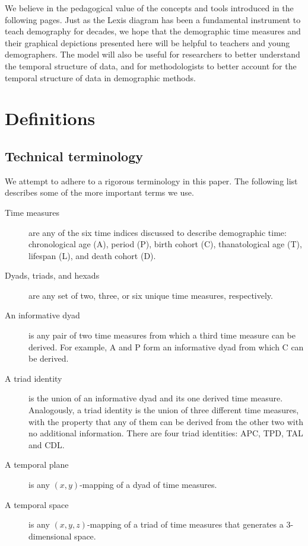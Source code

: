 \documentclass[12pt,oneside,letter]{article} %
\begin{document}
We believe in the pedagogical value of the concepts and tools introduced in the
following pages. Just as the Lexis diagram has been a fundamental instrument to
teach demography for decades, we hope that the demographic time measures and
their graphical depictions presented here will be helpful to teachers and
young demographers. The model will also be useful for researchers
to better understand the temporal structure of data, and for methodologists to
better account for the temporal structure of data in demographic methods.

\section*{Definitions}
\subsection*{Technical terminology}
We attempt to adhere to a rigorous terminology in this paper. The following list
describes some of the more important terms we use.
\begin{description}
\item[Time measures] are any of the six time indices discussed to describe demographic time: chronological age (A), period (P), birth cohort (C), thanatological
age (T), lifespan (L), and death cohort (D).
\item[Dyads, triads, and hexads] are any set of two, three, or six unique time
measures, respectively.
\item[An informative dyad] is any pair of two time measures from which a third
time measure can be derived. For example, A and P form an informative dyad from which C can be derived.
\item[A triad identity] is the union of an informative dyad and
its one derived time measure. Analogously, a triad identity is the union of
three different time measures, with the property that any of them can be derived from the other two with no additional information. There are four triad identities: APC, TPD, TAL and CDL.
\item[A temporal plane] is any $(x,y)$-mapping of a dyad of time measures.
\item[A temporal space] is any $(x,y,z)$-mapping of a triad of time
measures that generates a 3-dimensional space.
\end{description}
\end{document}
